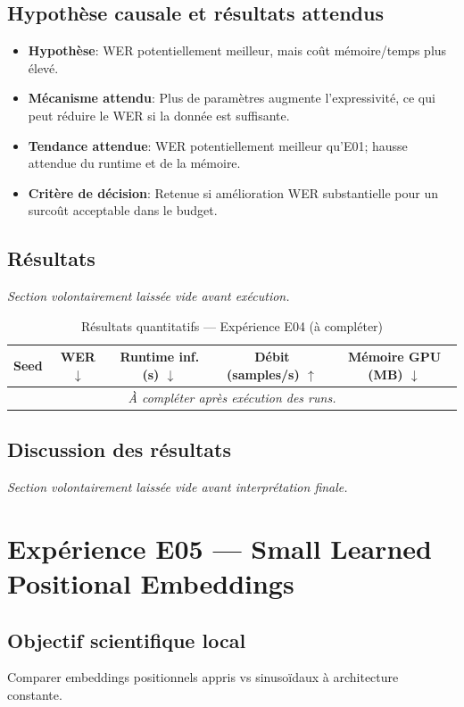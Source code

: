 \documentclass[11pt,a4paper]{article}
\begin{document}
\subsection{Hypothèse causale et résultats attendus}
\begin{itemize}[leftmargin=1.2cm]
\item \textbf{Hypothèse}: WER potentiellement meilleur, mais coût mémoire/temps plus élevé.
\item \textbf{Mécanisme attendu}: Plus de paramètres augmente l'expressivité, ce qui peut réduire le WER si la donnée est suffisante.
\item \textbf{Tendance attendue}: WER potentiellement meilleur qu'E01; hausse attendue du runtime et de la mémoire.
\item \textbf{Critère de décision}: Retenue si amélioration WER substantielle pour un surcoût acceptable dans le budget.
\end{itemize}

\subsection{Résultats}
\textit{Section volontairement laissée vide avant exécution.}

\begin{table}[H]
\centering
\caption{Résultats quantitatifs --- Expérience E04 (à compléter)}
\begin{tabular}{lcccc}
\toprule
Seed & WER $\downarrow$ & Runtime inf. (s) $\downarrow$ & Débit (samples/s) $\uparrow$ & Mémoire GPU (MB) $\downarrow$ \\
\midrule
\multicolumn{5}{c}{\textit{À compléter après exécution des runs.}} \\
\bottomrule
\end{tabular}
\end{table}

\subsection{Discussion des résultats}
\textit{Section volontairement laissée vide avant interprétation finale.}


\section{Expérience E05 --- Small Learned Positional Embeddings}
\subsection{Objectif scientifique local}
Comparer embeddings positionnels appris vs sinusoïdaux à architecture constante.
\end{document}
